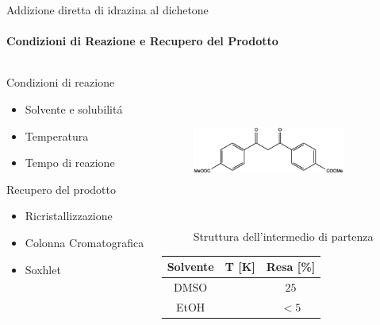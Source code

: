 \documentclass{beamer}
\begin{document}

\begin{frame}{Addizione diretta di idrazina al dichetone}
	\framesubtitle{Condizioni di Reazione e Recupero del Prodotto}
	\begin{columns}
		\hspace{1cm}
		\begin{column}{0.5\textwidth}
			Condizioni di reazione
			\begin{itemize}
				\item Solvente e solubilitá
				\item Temperatura
				\item Tempo di reazione
			\end{itemize}
			\vspace{0.2cm}
			Recupero del prodotto
			\begin{itemize}
				\item Ricristallizzazione
				\item Colonna Cromatografica
				\item Soxhlet
			\end{itemize}
		\end{column}
		\hspace{-3cm}
		\begin{column}{0.5\textwidth}
			\vspace{-0.5cm}
			\begin{figure}[h!]
				\centering
				\includegraphics[width=5cm,height=5cm,keepaspectratio]{../Structures/dikest2.eps}
				\caption{Struttura dell'intermedio di partenza}
			\end{figure}
			\begin{footnotesize}
				\begin{center}
					\begin{tabular}{ccc}
						\toprule
						{Solvente} & T [K] & Resa [\%] \\
						\midrule
						DMSO       &       & \(25\)    \\
						EtOH       &       & \(< 5\)   \\
						\bottomrule
					\end{tabular}
				\end{center}
			\end{footnotesize}
		\end{column}
	\end{columns}
\end{frame}
\end{document}
